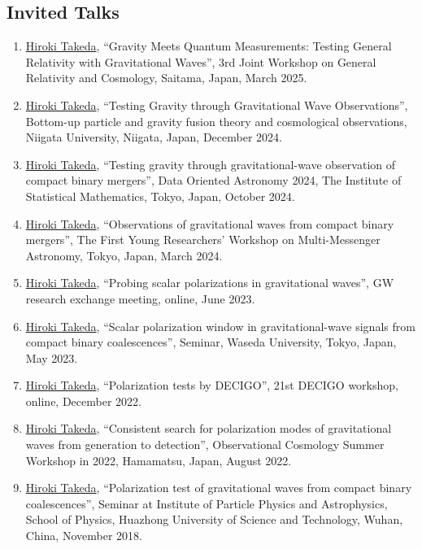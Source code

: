 \documentclass[uplatex, 12pt]{article}
\begin{document}
\subsection*{Invited Talks}
\begin{enumerate}
\item \uline{Hiroki Takeda}, “Gravity Meets Quantum Measurements: Testing General Relativity with Gravitational Waves”, 3rd Joint Workshop on General Relativity and Cosmology, Saitama, Japan, March 2025.
\item \uline{Hiroki Takeda}, “Testing Gravity through Gravitational Wave Observations”, Bottom-up particle and gravity fusion theory and cosmological observations, Niigata University, Niigata, Japan, December 2024.
\item \uline{Hiroki Takeda}, “Testing gravity through gravitational-wave observation of compact binary mergers”, Data Oriented Astronomy 2024, The Institute of Statistical Mathematics, Tokyo, Japan, October 2024.
\item \uline{Hiroki Takeda}, “Observations of gravitational waves from compact binary mergers”, The First Young Researchers' Workshop on Multi-Messenger Astronomy, Tokyo, Japan, March 2024.
\item \uline{Hiroki Takeda}, “Probing scalar polarizations in gravitational waves”, GW research exchange meeting, online, June 2023.
\item \uline{Hiroki Takeda}, “Scalar polarization window in gravitational-wave signals from compact binary coalescences”, Seminar, Waseda University, Tokyo, Japan, May 2023.
\item \uline{Hiroki Takeda}, “Polarization tests by DECIGO”, 21st DECIGO workshop, online, December 2022.
\item \uline{Hiroki Takeda}, “Consistent search for polarization modes of gravitational waves from generation to detection”, Observational Cosmology Summer Workshop in 2022, Hamamatsu, Japan, August 2022.
\item \uline{Hiroki Takeda}, “Polarization test of gravitational waves from compact binary coalescences”, Seminar at Institute of Particle Physics and Astrophysics, School of Physics, Huazhong University of Science and Technology, Wuhan, China, November 2018.
\end{enumerate}
\end{document}
